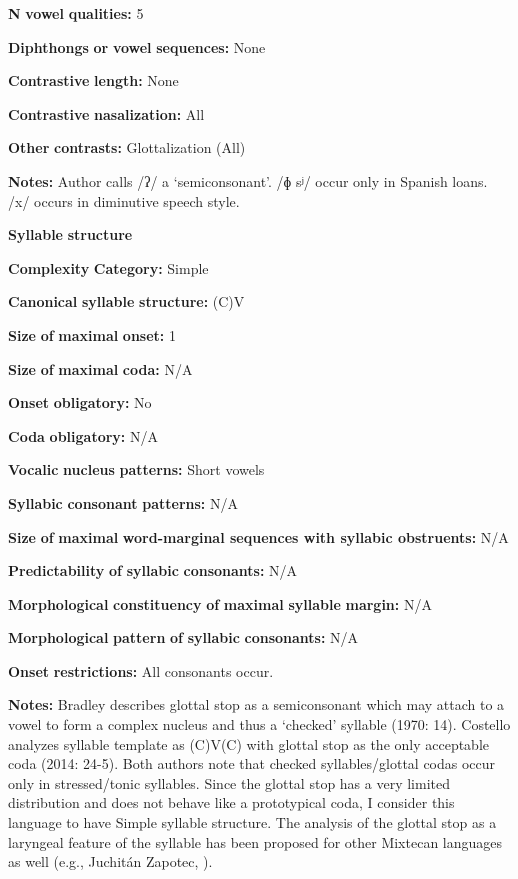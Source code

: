 \begin{styleBody}
\textbf{N} \textbf{vowel} \textbf{qualities:} 5

\textbf{Diphthongs} \textbf{or} \textbf{vowel} \textbf{sequences:} None

\textbf{Contrastive} \textbf{length:} None

\textbf{Contrastive} \textbf{nasalization:} All

\textbf{Other} \textbf{contrasts:} Glottalization (All)

\textbf{Notes:} Author calls /ʔ/ a ‘semiconsonant’. /ɸ sʲ/ occur only in Spanish loans. /x/ occurs in diminutive speech style.

\textbf{Syllable} \textbf{structure}

\textbf{Complexity} \textbf{Category:} Simple

\textbf{Canonical} \textbf{syllable} \textbf{structure:} (C)V \citep[14]{Bradley1970}

\textbf{Size} \textbf{of} \textbf{maximal} \textbf{onset:} 1

\textbf{Size} \textbf{of} \textbf{maximal} \textbf{coda:} N/A

\textbf{Onset} \textbf{obligatory:} No

\textbf{Coda} \textbf{obligatory:} N/A

\textbf{Vocalic} \textbf{nucleus} \textbf{patterns:} Short vowels

\textbf{Syllabic} \textbf{consonant} \textbf{patterns:} N/A

\textbf{Size} \textbf{of} \textbf{maximal} \textbf{word{}-marginal sequences with syllabic obstruents:} N/A

\textbf{Predictability} \textbf{of} \textbf{syllabic} \textbf{consonants:} N/A

\textbf{Morphological} \textbf{constituency} \textbf{of} \textbf{maximal} \textbf{syllable} \textbf{margin:} N/A

\textbf{Morphological} \textbf{pattern} \textbf{of} \textbf{syllabic} \textbf{consonants:} N/A

\textbf{Onset} \textbf{restrictions:} All consonants occur.

\textbf{Notes:} Bradley describes glottal stop as a semiconsonant which may attach to a vowel to form a complex nucleus and thus a ‘checked’ syllable (1970: 14). Costello analyzes syllable template as (C)V(C) with glottal stop as the only acceptable coda (2014: 24-5). Both authors note that checked syllables/glottal codas occur only in stressed/tonic syllables. Since the glottal stop has a very limited distribution and does not behave like a prototypical coda, I consider this language to have Simple syllable structure. The analysis of the glottal stop as a laryngeal feature of the syllable has been proposed for other Mixtecan languages as well (e.g., Juchitán Zapotec, \citealt{MarlettPickett1987}).


\end{styleBody}
